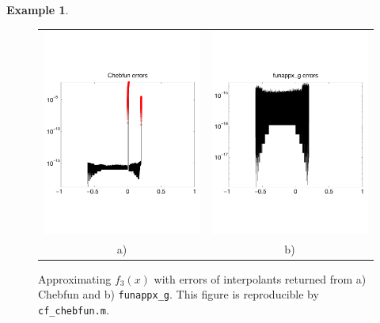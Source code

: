 \documentclass[review]{elsarticle}
\theoremstyle{definition}
\newtheorem{exmp}{Example}
\newcommand{\funappxg}{\texttt{funappx\_g\xspace}}
\begin{document}
\begin{exmp}
%
\begin{figure}[tbh]
\centering
\begin{tabular}{cc}
\includegraphics[width=5.9cm]{figure/chebfun_errors.pdf} \hspace{-2ex} &
\includegraphics[width=5.9cm]{figure/funappx_g_errors.pdf}
\\ a) & b)
\end{tabular}
\caption{Approximating $f_3(x)$ with errors of interpolants returned from a)
Chebfun and b) \funappxg. This figure is reproducible by
\texttt{cf\_chebfun.m}. \label{f3chebfig}}
\end{figure}
%

\end{exmp}

\end{document}
